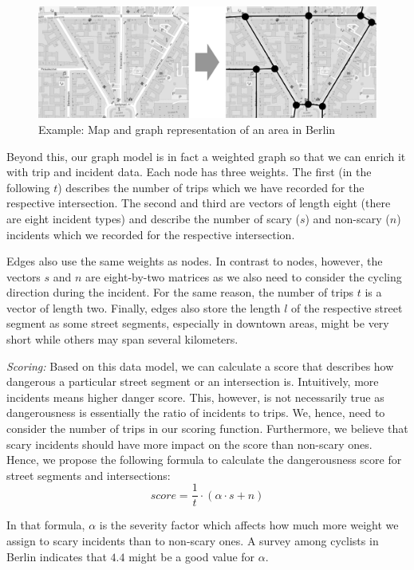 \begin{figure}
    \center
    \includegraphics[width=0.65\columnwidth]{fig/map_to_graph.pdf}
		\caption{Example: Map and graph representation of an area in Berlin\protect\footnotemark}
    \label{fig:map_to_graph}
\end{figure}
Beyond this, our graph model is in fact a weighted graph so that we can enrich it with trip and incident data.
Each node has three weights.
The first (in the following $t$) describes the number of trips which we have recorded for the respective intersection.
The second and third are vectors of length eight (there are eight incident types) and describe the number of scary ($s$) and non-scary ($n$) incidents which we recorded for the respective intersection.

Edges also use the same weights as nodes.
In contrast to nodes, however, the vectors $s$ and $n$ are eight-by-two matrices as we also need to consider the cycling direction during the incident.
For the same reason, the number of trips $t$ is a vector of length two.
Finally, edges also store the length $l$ of the respective street segment as some street segments, especially in downtown areas, might be very short while others may span several kilometers.


\textit{Scoring:} Based on this data model, we can calculate a score that describes how dangerous a particular street segment or an intersection is.
Intuitively, more incidents means higher danger score.
This, however, is not necessarily true as dangerousness is essentially the ratio of incidents to trips.
We, hence, need to consider the number of trips in our scoring function.
Furthermore, we believe that scary incidents should have more impact on the score than non-scary ones.
Hence, we propose the following formula to calculate the dangerousness score for street segments and intersections:
\begin{equation} \label{eq:score} score = \frac{1}{t} \cdot (\alpha \cdot s + n)\end{equation}

In that formula, $\alpha$ is the severity factor which affects how much more weight we assign to scary incidents than to non-scary ones.
A survey among cyclists in Berlin indicates that $4.4$ might be a good value for $\alpha$.

